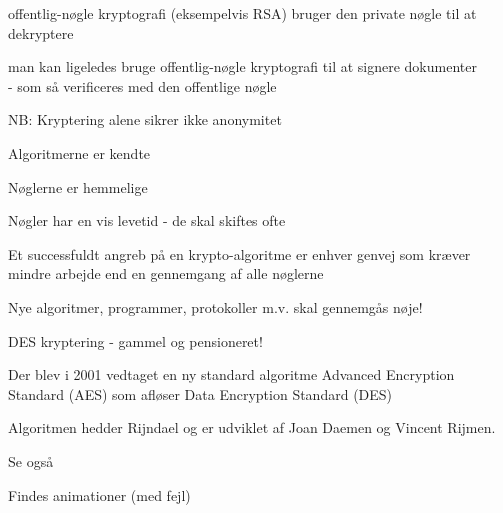 \documentclass[Screen16to9,17pt]{foils}
\begin{document}
\begin{list1}
\item offentlig-nøgle kryptografi (eksempelvis RSA) bruger den private
  nøgle til at dekryptere
\item man kan ligeledes bruge offentlig-nøgle kryptografi til at
  signere dokumenter\\ - som så verificeres med den offentlige nøgle
\item NB: Kryptering alene sikrer ikke anonymitet
\end{list1}



\begin{list1}
\item Algoritmerne er kendte
\item Nøglerne er hemmelige
\item Nøgler har en vis levetid - de skal skiftes ofte
\item Et successfuldt angreb på en krypto-algoritme er enhver genvej
  som kræver mindre arbejde end en gennemgang af alle nøglerne
\item Nye algoritmer, programmer, protokoller m.v. skal gennemgås nøje!
\end{list1}



\begin{list1}
\item DES kryptering - gammel og pensioneret!
\item Der blev i 2001 vedtaget en ny standard algoritme Advanced Encryption
  Standard (AES) som afløser Data Encryption Standard (DES)
\item Algoritmen hedder Rijndael og er udviklet
af Joan Daemen og Vincent Rijmen.
\item Se også 
\item Findes animationer (med fejl) 
\end{list1}


\end{document}
